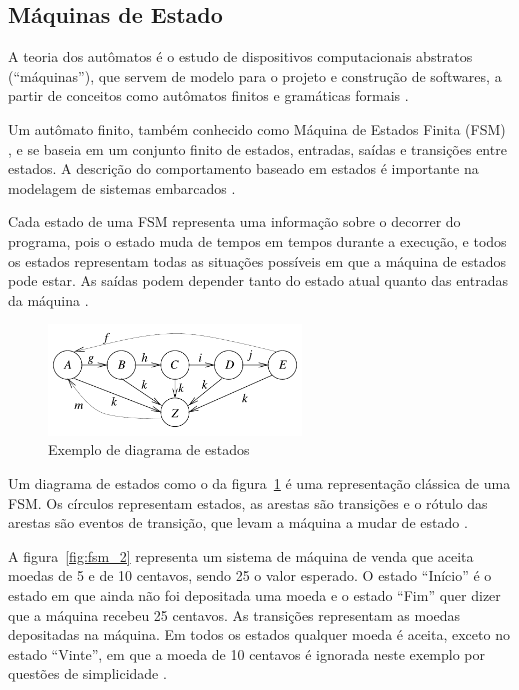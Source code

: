 \subsection{Máquinas de Estado}

A teoria dos autômatos é o estudo de dispositivos computacionais abstratos (``máquinas''), que servem de modelo para o projeto e construção de softwares, a partir de conceitos como autômatos finitos e gramáticas formais \cite{hopcroft:2001}.

Um autômato finito, também conhecido como Máquina de Estados Finita (FSM) \cite{wagner:2006}, e se baseia em um conjunto finito de estados, entradas, saídas e transições entre estados. A descrição do comportamento baseado em estados é importante na modelagem de sistemas embarcados \cite{marwedel:2010}.

Cada estado de uma FSM representa uma informação sobre o decorrer do programa, pois o estado muda de tempos em tempos durante a execução, e todos os estados representam todas as situações possíveis em que a máquina de estados pode estar. As saídas podem depender tanto do estado atual quanto das entradas da máquina \cite{wagner:2006}.

\begin{figure}[ht]
	\caption{\label{fig:fsm}Exemplo de diagrama de estados}
	\begin{center}
	    \includegraphics[width=0.6\textwidth]{resources/fsm_marwedel}
	\end{center}
\end{figure}

Um diagrama de estados como o da figura~\ref{fig:fsm} é uma representação clássica de uma FSM. Os círculos representam estados, as arestas são transições e o rótulo das arestas são eventos de transição, que levam a máquina a mudar de estado \cite{marwedel:2010}.

A figura~\ref{fig:fsm_2} representa um sistema de máquina de venda que aceita moedas de 5 e de 10 centavos, sendo 25 o valor esperado. O estado ``Início'' é o estado em que ainda não foi depositada uma moeda e o estado ``Fim'' quer dizer que a máquina recebeu 25 centavos. As transições representam as moedas depositadas na máquina. Em todos os estados qualquer moeda é aceita, exceto no estado ``Vinte'', em que a moeda de 10 centavos é ignorada neste exemplo por questões de simplicidade \cite{wagner:2006}.

